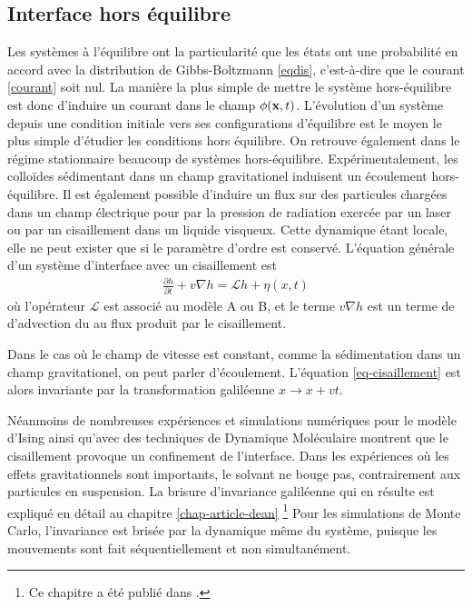     \subsection{Interface hors équilibre}

Les systèmes à l'équilibre ont la particularité que les états ont une probabilité en accord avec la distribution de Gibbs-Boltzmann \ref{eqdis}, c'est-à-dire que le courant \ref{courant} soit nul. La manière la plus simple de mettre le système hors-équilibre est donc d'induire un courant dans le champ $\phi({\bf x},t)$. L'évolution d'un système depuis une condition initiale vers ses configurations d'équilibre est le moyen le plus simple d'étudier les conditions hors équilibre. On retrouve également dans le régime stationnaire beaucoup de systèmes hors-équilibre. Expérimentalement, les colloïdes sédimentant dans un champ gravitationel induisent un écoulement hors-équilibre. Il est également possible d'induire un flux sur des particules chargées dans un champ électrique pour par la pression de radiation exercée par un laser ou par un cisaillement dans un liquide visqueux. Cette dynamique étant locale, elle ne peut exister que si le paramètre d'ordre est conservé. L'équation générale d'un système d'interface avec un cisaillement est\cite{bray_interface_2001-1,bray_interface_2001}
\begin{align}
     \frac{\partial h}{\partial t} + v \nabla h =  \mathcal{L} h +  \eta(x,t)
     \label{eq-cisaillement}
\end{align}
où l'opérateur $\mathcal{L}$ est associé au modèle A ou B, et le terme $v \nabla h$ est un terme de d'advection du au flux produit par le cisaillement. 

Dans le cas où le champ de vitesse est constant, comme la sédimentation dans un champ gravitationel, on peut parler d'écoulement. L'équation \ref{eq-cisaillement} est alors invariante par la transformation galiléenne $x \rightarrow x+vt$. 



Néanmoins de nombreuses expériences\cite{derks_suppression_2006} et simulations numériques pour le modèle d'Ising \cite{leung_field_1986,rikvold_microstructure_2002,gonnella_nonequilibrium_2009,smith_driven_2010,smith_interfaces_2008,sadhu_non-local_2014,cohen_interface_2016,cirillo_monte_2005} ainsi qu'avec des techniques de Dynamique Moléculaire \cite{berthier_nonequilibrium_2002} montrent que le cisaillement provoque un confinement de l'interface. Dans les expériences où les effets gravitationnels sont importants, le solvant ne bouge pas, contrairement aux particules en suspension. La brisure d'invariance galiléenne qui en résulte est expliqué en détail au chapitre \ref{chap-article-dean} \footnote{Ce chapitre a été publié dans \cite{dean_effect_2020}.}
Pour les simulations de Monte Carlo, l'invariance est brisée par la dynamique même du système, puisque les mouvements sont fait séquentiellement et non simultanément.

